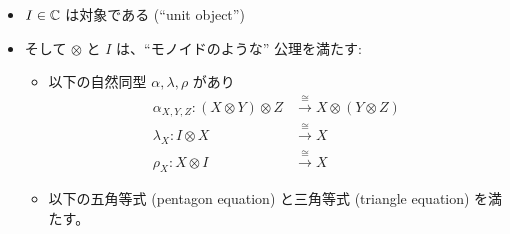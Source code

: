 \documentclass[
		head_space=20mm,
		foot_space=20mm,
		gutter=10mm,
		line_length=190mm
]{jlreq}
\begin{document}
\begin{definition}[モノイダル圏]
\begin{itemize}
\begin{itemize}
\begin{align*}
			\end{align*}\vspace{1pt}
		\end{itemize}
		\item $I\in\mathbb{C}$ は対象である (``unit object'') \vspace{3pt}
		\item そして $\otimes$ と $I$ は、``モノイドのような'' 公理を満たす: 
		\begin{itemize}
			\item[\bullet~] 以下の自然同型 $\alpha,\lambda,\rho$ があり
			\begin{align*}
				\alpha_{X,Y,Z}\colon(X\otimes Y)\otimes Z &\xrightarrow{~\cong~} X\otimes(Y\otimes Z) \\
				\lambda_X\colon I\otimes X &\xrightarrow{~\cong~} X \\
				\rho_X\colon X\otimes I &\xrightarrow{~\cong~} X 
			\end{align*}
			\item[\bullet~] 以下の五角等式 (pentagon equation) と三角等式 (triangle equation) を満たす。%

\end{itemize}
\end{itemize}
\end{definition}
\end{document}
